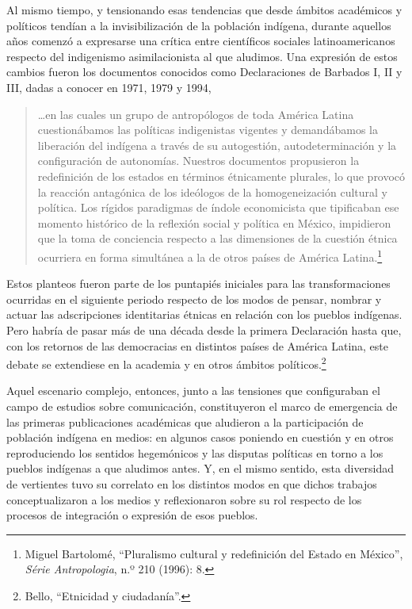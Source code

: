 \documentclass{tufte-handout}
\begin{document}
Al mismo tiempo, y tensionando esas tendencias que desde ámbitos
académicos y políticos tendían a la invisibilización de la población
indígena, durante aquellos años comenzó a expresarse una crítica entre
científicos sociales latinoamericanos respecto del indigenismo
asimilacionista al que aludimos. Una expresión de estos cambios fueron
los documentos conocidos como Declaraciones de Barbados I, II y III,
dadas a conocer en 1971, 1979 y 1994,

\begin{quote}
\ldots en las cuales un grupo de antropólogos de toda América Latina
cuestionábamos las políticas indigenistas vigentes y demandábamos la
liberación del indígena a través de su autogestión, autodeterminación y
la configuración de autonomías. Nuestros documentos propusieron la
redefinición de los estados en términos étnicamente plurales, lo que
provocó la reacción antagónica de los ideólogos de la homogeneización
cultural y política. Los rígidos paradigmas de índole economicista que
tipificaban ese momento histórico de la reflexión social y política en
México, impidieron que la toma de conciencia respecto a las dimensiones
de la cuestión étnica ocurriera en forma simultánea a la de otros países
de América Latina.\footnote{Miguel Bartolomé, ``Pluralismo cultural y
  redefinición del Estado en México'', \emph{Série Antropologia}, n.º
  210 (1996): 8.}
\end{quote}

Estos planteos fueron parte de los puntapiés iniciales para las
transformaciones ocurridas en el siguiente periodo respecto de los modos
de pensar, nombrar y actuar las adscripciones identitarias étnicas en
relación con los pueblos indígenas. Pero habría de pasar más de una
década desde la primera Declaración hasta que, con los retornos de las
democracias en distintos países de América Latina, este debate se
extendiese en la academia y en otros ámbitos políticos.\footnote{Bello,
  ``Etnicidad y ciudadanía''.}

Aquel escenario complejo, entonces, junto a las tensiones que
configuraban el campo de estudios sobre comunicación, constituyeron el
marco de emergencia de las primeras publicaciones académicas que
aludieron a la participación de población indígena en medios: en algunos
casos poniendo en cuestión y en otros reproduciendo los sentidos
hegemónicos y las disputas políticas en torno a los pueblos indígenas a
que aludimos antes. Y, en el mismo sentido, esta diversidad de
vertientes tuvo su correlato en los distintos modos en que dichos
trabajos conceptualizaron a los medios y reflexionaron sobre su rol
respecto de los procesos de integración o expresión de esos pueblos.
\end{document}
